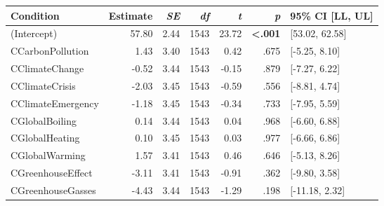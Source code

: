 \begin{table}[ht]
\centering
\begin{tabular}{lrrrrrl}
  \hline
Condition & Estimate & \textit{SE} & \textit{df} & \textit{t} & \textit{p} & 95\% CI [LL, UL] \\ 
  \hline
(Intercept) & 57.80 & 2.44 & 1543 & 23.72 & \textbf{\textless  .001} & [53.02, 62.58] \\ 
  CCarbonPollution & 1.43 & 3.40 & 1543 & 0.42 & .675 & [-5.25, 8.10] \\ 
  CClimateChange & -0.52 & 3.44 & 1543 & -0.15 & .879 & [-7.27, 6.22] \\ 
  CClimateCrisis & -2.03 & 3.45 & 1543 & -0.59 & .556 & [-8.81, 4.74] \\ 
  CClimateEmergency & -1.18 & 3.45 & 1543 & -0.34 & .733 & [-7.95, 5.59] \\ 
  CGlobalBoiling & 0.14 & 3.44 & 1543 & 0.04 & .968 & [-6.60, 6.88] \\ 
  CGlobalHeating & 0.10 & 3.45 & 1543 & 0.03 & .977 & [-6.66, 6.86] \\ 
  CGlobalWarming & 1.57 & 3.41 & 1543 & 0.46 & .646 & [-5.13, 8.26] \\ 
  CGreenhouseEffect & -3.11 & 3.41 & 1543 & -0.91 & .362 & [-9.80, 3.58] \\ 
  CGreenhouseGasses & -4.43 & 3.44 & 1543 & -1.29 & .198 & [-11.18, 2.32] \\ 
   \hline
\end{tabular}
\end{table}
